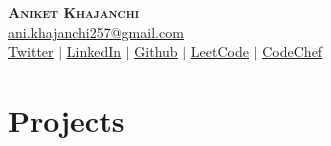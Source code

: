 \documentclass[letterpaper,11pt]{article}
\makeatletter
\newcommand{\resumeItem}[1]{
  \item\small{
    {#1 \vspace{-2pt}}
  }
}
\newcommand{\resumeSubheading}[4]{
  \vspace{-2pt}\item
    \begin{tabular*}{0.97\textwidth}[t]{l@{\extracolsep{\fill}}r}
      \textbf{#1} & #2 \\
      \textit{\small#3} & \textit{\small #4} \\
    \end{tabular*}\vspace{-7pt}
}
\newcommand{\resumeSubSubheading}[2]{
    \item
    \begin{tabular*}{0.97\textwidth}{l@{\extracolsep{\fill}}r}
      \textit{\small#1} & \textit{\small #2} \\
    \end{tabular*}\vspace{-7pt}
}
\newcommand{\resumeSubHeadingListStart}{\begin{itemize}[leftmargin=0.15in, label={}]}
\newcommand{\resumeSubHeadingListEnd}{\end{itemize}}
\newcommand{\resumeItemListStart}{\begin{itemize}}
\newcommand{\resumeItemListEnd}{\end{itemize}\vspace{-5pt}}
\makeatother
\begin{document}

\begin{center}
    \textbf{\Huge \scshape Aniket Khajanchi} \\ \vspace{1pt}
    \href{mailto:ani.khajanchi257@gmail.com}{\color{blue}\underline{ani.khajanchi257@gmail.com}} \\ 
    \href{https://twitter.com/AniketKhajanchi}{\color{blue}\underline{Twitter}} $|$ 
    \href{https://linkedin.com/in/aniketkhajanchi}{\color{blue}\underline{LinkedIn}} $|$
    \href{https://github.com/aniketk13}{\color{blue}\underline{Github}} $|$
    \href{https://leetcode.com/aniketk13}{\color{blue}\underline{LeetCode}} $|$
    \href{https://codechef.com/users/aniketk13}{\color{blue}\underline{CodeChef}}
    
\end{center}


        
    




\section{Projects}
\end{document}
